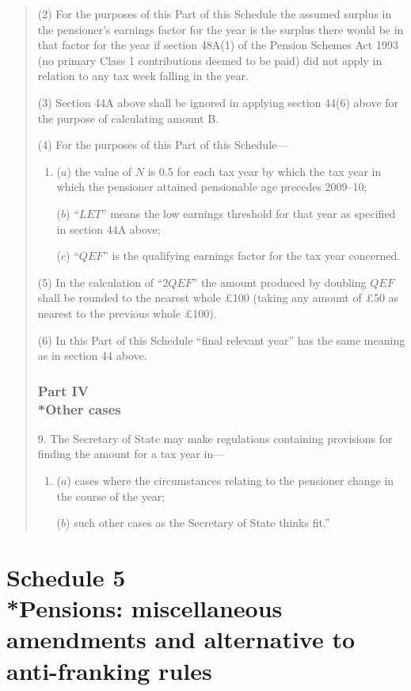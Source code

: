 \documentclass[12pt,a4paper]{article}
\begin{document}
\begin{quotation}
(2) For the purposes of this Part of this Schedule the assumed surplus in the pensioner’s earnings factor for the year is the surplus there would be in that factor for the year if section 48A(1)  of the Pension Schemes Act 1993 (no primary Class 1 contributions deemed to be paid) did not apply in relation to any tax week falling in the year.

(3) Section 44A above shall be ignored in applying section 44(6)  above for the purpose of calculating amount B.

(4) For the purposes of this Part of this Schedule—
\begin{enumerate}\item[]
($a$) the value of $N$ is 0.5 for each tax year by which the tax year in which the pensioner attained pensionable age precedes 2009--10;

($b$) “$LET$” means the low earnings threshold for that year as specified in section 44A above;

($c$) “$QEF$” is the qualifying earnings factor for the tax year concerned.
\end{enumerate}

(5) In the calculation of “$2QEF$” the amount produced by doubling $QEF$ shall be rounded to the nearest whole £100 (taking any amount of £50 as nearest to the previous whole £100).

(6) In this Part of this Schedule “final relevant year” has the same meaning as in section 44 above.

\section*{Part IV\\*Other cases}

9. The Secretary of State may make regulations containing provisions for finding the amount for a tax year in—
\begin{enumerate}\item[]
($a$) cases where the circumstances relating to the pensioner change in the course of the year;

($b$) such other cases as the Secretary of State thinks fit.”
\end{enumerate}
\end{quotation}

\part[Schedule 5 --- Pensions: miscellaneous amendments and alternative to anti-franking rules]{Schedule 5\\*Pensions: miscellaneous amendments and alternative to anti-franking rules}
\end{document}
